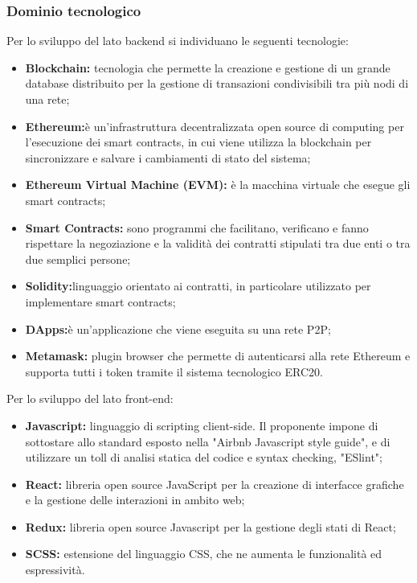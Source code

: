 \subsubsection{Dominio tecnologico}
Per lo sviluppo del lato backend si individuano le seguenti tecnologie:
\begin{itemize}
    \item \textbf{Blockchain:} tecnologia che permette la creazione e gestione di un grande database distribuito per la gestione di transazioni condivisibili tra più nodi di una rete;
	\item \textbf{Ethereum:}è un'infrastruttura decentralizzata open source di 
computing per l'esecuzione dei smart contracts, in cui viene utilizza la blockchain per sincronizzare e salvare i cambiamenti di stato del sistema;
	\item \textbf{Ethereum Virtual Machine (EVM): }è la macchina virtuale che 
esegue gli smart contracts;
	\item \textbf{Smart Contracts:} sono programmi che facilitano, verificano e fanno rispettare la negoziazione e la validità dei contratti stipulati tra due enti o tra due semplici persone;
	\item \textbf{Solidity:}linguaggio orientato ai contratti, in particolare utilizzato per 
implementare smart contracts;
	\item \textbf{DApps:}è un'applicazione che viene eseguita su una rete P2P;
	\item \textbf{Metamask:} plugin browser che permette di autenticarsi alla rete 
Ethereum e supporta tutti i token tramite il sistema tecnologico ERC20.

\end{itemize}
Per lo sviluppo del lato front-end:
\begin{itemize}
	\item \textbf{Javascript:} linguaggio di scripting client-side. Il proponente 
impone di sottostare allo standard esposto nella "Airbnb Javascript style 
guide", e di utilizzare un toll di analisi statica del codice e syntax checking, 
"ESlint";
	\item \textbf{React:}  libreria open source JavaScript per la creazione di 
interfacce grafiche e la gestione delle interazioni in ambito web;
	\item \textbf {Redux:} libreria open source Javascript per la gestione degli 
stati di React;
	
	\item \textbf{SCSS:} estensione del linguaggio CSS, che ne aumenta le 
funzionalità ed espressività.
\end{itemize}


